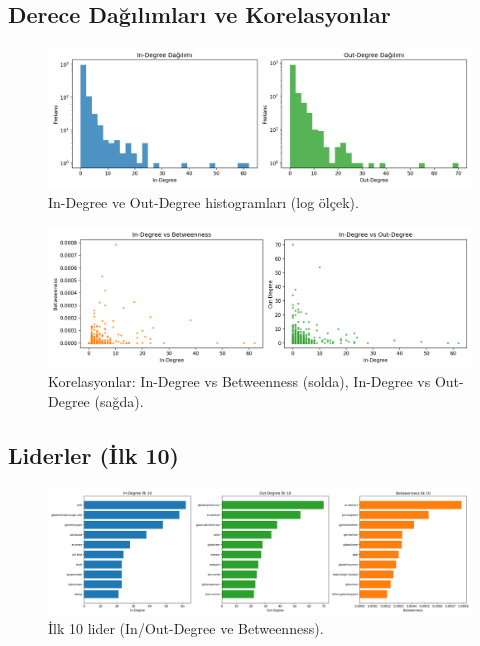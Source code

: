 \documentclass[11pt,a4paper]{article}
\begin{document}
\subsection{Derece Dağılımları ve Korelasyonlar}
\begin{figure}[h]
  \centering
  \includegraphics[width=0.95\linewidth]{degree_histograms.png}

  \caption{In-Degree ve Out-Degree histogramları (log ölçek).}
\end{figure}

\begin{figure}[h]
  \centering
  \includegraphics[width=0.95\linewidth]{scatter_correlations.png}

  \caption{Korelasyonlar: In-Degree vs Betweenness (solda), In-Degree vs Out-Degree (sağda).}
\end{figure}

\subsection{Liderler (İlk 10)}
\begin{figure}[h]
  \centering
  \includegraphics[width=0.95\linewidth]{top10_leaders.png}

  \caption{İlk 10 lider (In/Out-Degree ve Betweenness).}
\end{figure}
\end{document}
